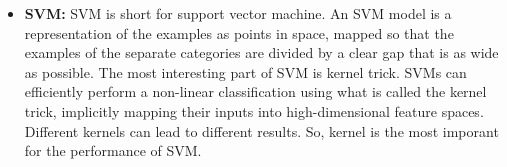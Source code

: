 \begin{itemize}
\item \textbf{SVM:}
SVM is short for support vector machine.
An SVM model is a representation of the examples as points in space,
mapped so that the examples of the separate categories are divided
by a clear gap that is as wide as possible.
The most interesting part of SVM is kernel trick.
SVMs can efficiently perform a non-linear classification using what is called the kernel trick,
implicitly mapping their inputs into high-dimensional feature spaces.
Different kernels can lead to different results.
So, kernel is the most imporant for the performance of SVM.
\end{itemize}
